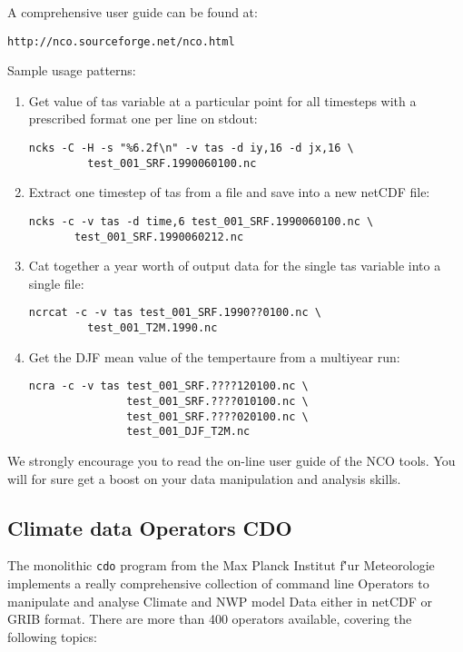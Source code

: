 A comprehensive user guide can be found at:

\begin{Verbatim}
http://nco.sourceforge.net/nco.html
\end{Verbatim}

Sample usage patterns:
\begin{enumerate}
\item Get value of tas variable at a particular point for all timesteps with
a prescribed format one per line on stdout:
\begin{Verbatim}
ncks -C -H -s "%6.2f\n" -v tas -d iy,16 -d jx,16 \
         test_001_SRF.1990060100.nc
\end{Verbatim}
\item Extract one timestep of tas from a file and save into a new netCDF file:
\begin{Verbatim}
ncks -c -v tas -d time,6 test_001_SRF.1990060100.nc \
       test_001_SRF.1990060212.nc
\end{Verbatim}
\item Cat together a year worth of output data for the single tas variable
into a single file:
\begin{Verbatim}
ncrcat -c -v tas test_001_SRF.1990??0100.nc \
         test_001_T2M.1990.nc
\end{Verbatim}
\item Get the DJF mean value of the tempertaure from a multiyear run:
\begin{Verbatim}
ncra -c -v tas test_001_SRF.????120100.nc \
               test_001_SRF.????010100.nc \
               test_001_SRF.????020100.nc \
               test_001_DJF_T2M.nc
\end{Verbatim}
\end{enumerate}

We strongly encourage you to read the on-line user guide of the NCO tools.
You will for sure get a boost on your data manipulation and analysis skills.

\subsection{Climate data Operators CDO}

The monolithic \verb=cdo= program from the Max Planck Institut f\''ur
Meteorologie implements a really comprehensive collection of command line
Operators to manipulate and analyse Climate and NWP model Data either in netCDF
or GRIB format. There are more than 400 operators available, covering the
following topics:

